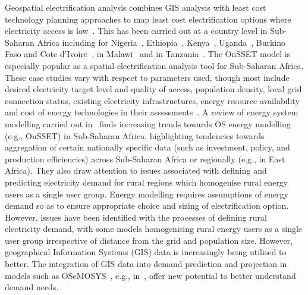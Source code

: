 \documentclass[conference, a4paper]{IEEEtran}
\begin{document}
Geospatial electrification analysis combines GIS analysis with least cost technology planning approaches to map least cost electrification options where electricity access is low~\cite{mentis-howells-ea-2017,trotter-cooper-ea-2019}. This has been carried out at a country level in Sub-Saharan Africa including for Nigeria~\cite{mentis-siyal-ea-2017,nerini-broad-ea-2016,mentis-welsch-ea-2015}, Ethiopia~\cite{mentis-andersson-ea-2016}, Kenya~\cite{mentis-howells-ea-2017,szabo-moner-girona-ea-2016,mentis-welsch-ea-2015}, Uganda~\cite{trotter-cooper-ea-2019}, Burkino Faso and Cote d’Ivoire~\cite{bissiri-moura-ea-2020}, in Malawi~\cite{korkovelos-khavari-ea-2019} and in Tanzania~\cite{menghwani-zerriffi-ea-2020}. The OnSSET model is especially popular as a spatial electrification analysis tool for Sub-Saharan Africa. These case studies vary with respect to parameters used, though most include desired electricity target level and quality of access, population density, local grid connection status, existing electricity infrastructures, energy resource availability and cost of energy technologies in their assessments~\cite{menghwani-zerriffi-ea-2020}. A review of energy system modelling carried out in~\cite{rocco-fumagalli-ea-2021} finds increasing trends towards OS energy modelling (e.g., OnSSET) in Sub-Saharan Africa, highlighting tendencies towards aggregation of certain nationally specific data (such as investment, policy, and production efficiencies) across Sub-Saharan Africa or regionally (e.g., in East Africa). They also draw attention to issues associated with defining and predicting electricity demand for rural regions which homogenise rural energy users as a single user group. Energy modelling requires assumptions of energy demand so as to ensure appropriate choice and sizing of electrification option. However, issues have been identified with the processes of defining rural electricity demand, with some models homogenising rural energy users as a single user group irrespective of distance from the grid and population size. However, geographical Information Systems (GIS) data is increasingly being utilised to better. The integration of GIS data into demand prediction and projection in models such as OSeMOSYS~\cite{howells-rogner-ea-2011}, e.g., in~\cite{rocco-fumagalli-ea-2021}, offer new potential to better understand demand needs.  
\end{document}
